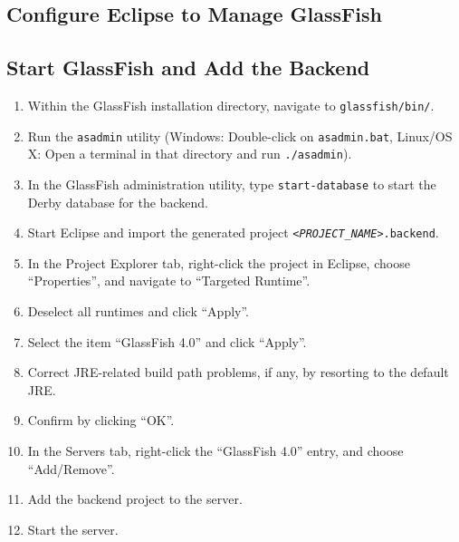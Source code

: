 
\subsection{Configure Eclipse to Manage GlassFish}




\subsection{Start GlassFish and Add the Backend}

\begin{enumerate}
\item Within the GlassFish installation directory, navigate to \texttt{glassfish/bin/}.
\item Run the \texttt{asadmin} utility (Windows: Double-click on \texttt{asadmin.bat}, Linux/OS X: Open a terminal in that directory and run \texttt{./asadmin}).
\item In the GlassFish administration utility, type \texttt{start-database} to start the Derby database for the backend.
\item Start Eclipse and import the generated project \texttt{\textit{<PROJECT\_NAME>}.backend}.
\item In the Project Explorer tab, right-click the project in Eclipse, choose \enquote{Properties}, and navigate to \enquote{Targeted Runtime}.
\item Deselect all runtimes and click \enquote{Apply}.
\item Select the item \enquote{GlassFish 4.0} and click \enquote{Apply}.
\item Correct JRE-related build path problems, if any, by resorting to the default JRE.
\item Confirm by clicking \enquote{OK}.
\item In the Servers tab, right-click the \enquote{GlassFish 4.0} entry, and choose \enquote{Add/Remove}.
\item Add the backend project to the server.
\item Start the server.
\end{enumerate}